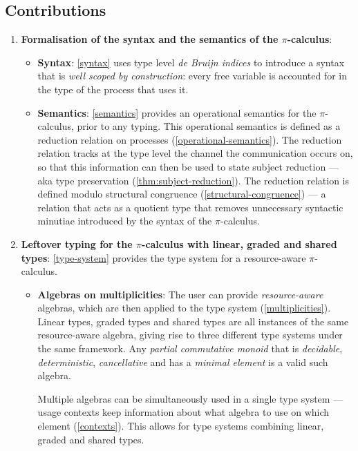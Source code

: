 \documentclass[a4paper,UKenglish,cleveref,autoref,thm-restate,authorcolumns]{lipics-v2019}
\theoremstyle{definition}
\newcommand{\picalc}{$\pi$-calculus}
\begin{document}
\subsection{Contributions}
\begin{enumerate}
\item \textbf{Formalisation of the syntax and the semantics of the \picalc{}}:
 \begin{itemize}
   \item \textbf{Syntax}: \autoref{syntax} uses type level \emph{de Bruijn indices} \cite{deBruijn1972, Dybjer1994} to introduce a syntax that is \emph{well scoped by construction}: every free variable is accounted for in the type of the process that uses it.
   
   \item \textbf{Semantics}: \autoref{semantics} provides an operational semantics for the \picalc{}, prior to any typing.
   This operational semantics is defined as a reduction relation on processes (\autoref{operational-semantics}).
   The reduction relation tracks at the type level the channel the communication occurs on, so that this information can then be used to state subject reduction --- aka type preservation (\autoref{thm:subject-reduction}).
   The reduction relation is defined modulo structural congruence (\autoref{structural-congruence}) --- a relation that acts as a quotient type that removes unnecessary syntactic minutiae introduced by the syntax of the \picalc{}.
 \end{itemize}
  
  \item \textbf{Leftover typing for the \picalc{} with linear, graded and shared types}:
  \autoref{type-system} provides the type system for a resource-aware \picalc{}.
  \begin{itemize}
    \item \textbf{Algebras on multiplicities}: The user can provide \emph{resource-aware} algebras, which are then applied to the type system (\autoref{multiplicities}).
    Linear types, graded types and shared types are all instances of the same resource-aware algebra, giving rise to three different type systems under the same framework.
    Any \emph{partial commutative monoid} that is \emph{decidable}, \emph{deterministic}, \emph{cancellative} and has a \emph{minimal element} is a valid such algebra.
    
    Multiple algebras can be simultaneously used in a single type system --- usage contexts keep information about what algebra to use on which element (\autoref{contexts}).
    This allows for type systems combining linear, graded and shared types.
    

\end{itemize}
\end{enumerate}
\end{document}
